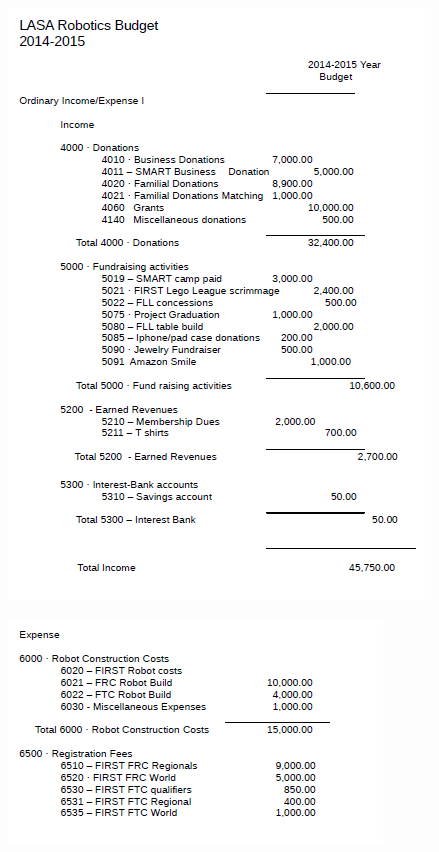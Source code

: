 \begin{figure}[H]
	\centering
	\includegraphics[width=0.9\linewidth]{budget}
\end{figure}
\begin{figure}[H]
	\centering
	\includegraphics[width=0.9\linewidth]{budget2}
\end{figure}
